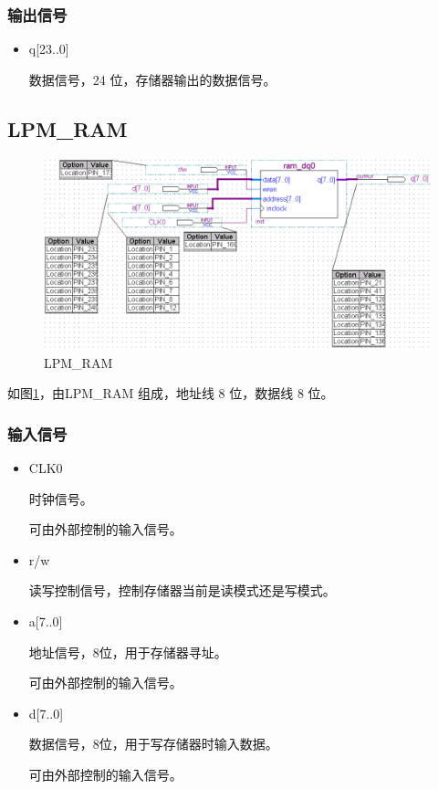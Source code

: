\subsubsection{输出信号}

\begin{itemize}
    \item q[23..0]
    
    数据信号，24 位，存储器输出的数据信号。
    
\end{itemize}

\subsection{LPM\_RAM}

\begin{figure}[H]
\centering
\includegraphics[width=\textwidth]{images/prin2_2.png}
\caption{LPM\_RAM}
\label{fig:prin2_2}
\end{figure}

如图\ref{fig:prin2_2}，由LPM\_RAM 组成，地址线 8 位，数据线 8 位。

\subsubsection{输入信号}

\begin{itemize}
    \item CLK0
    
    时钟信号。

    可由外部控制的输入信号。
    
    \item r/w
    
    读写控制信号，控制存储器当前是读模式还是写模式。
    
    \item a[7..0]
    
    地址信号，8位，用于存储器寻址。
    
    可由外部控制的输入信号。

    \item d[7..0]
    
    数据信号，8位，用于写存储器时输入数据。
    
    可由外部控制的输入信号。
    
\end{itemize} 

